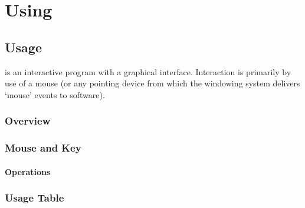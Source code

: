 \chapter{Using \dtypkgu{}}

\section{Usage}%

\IXpkgu{} is an interactive program with a
graphical interface. Interaction is primarily by use of a mouse
(or any pointing device from which the windowing system delivers
`mouse' events to software).


\subsection{Overview}%
\subsection{Mouse and Key}%
\subsubsection{Operations}%
\subsection{Usage Table}%


